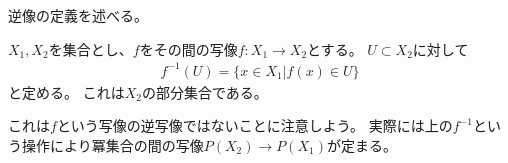 \documentclass[uplatex]{jsarticle}
\begin{document}
逆像の定義を述べる。
\begin{dfn}[写像による部分集合の逆像]
  $X_1, X_2$を集合とし、$f$をその間の写像$f:X_1 \to X_2$とする。
  $U\subset X_2$に対して
  \begin{align*}
    f^{-1}(U)=\{x\in X_1\vert f(x)\in U\}
  \end{align*}
  と定める。
  これは$X_2$の部分集合である。
\end{dfn}
 
これは$f$という写像の逆写像ではないことに注意しよう。
実際には上の$f^{-1}$という操作により冪集合の間の写像$P(X_2)\to P(X_1)$が定まる。




\end{document}
